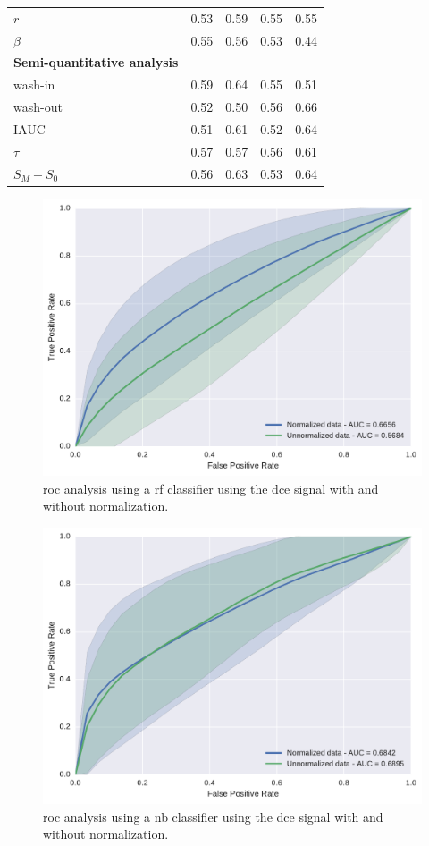 \begin{table}
\begin{tabular}{l c c c c}
    \quad $r$         & 0.53 & 0.59 & 0.55 & 0.55 \\
    \quad $\beta$     & 0.55 & 0.56 & 0.53 & 0.44 \\
    \textbf{Semi-quantitative analysis} & & & & \\
    \quad wash-in     & 0.59 & 0.64 & 0.55 & 0.51 \\
    \quad wash-out    & 0.52 & 0.50 & 0.56 & 0.66 \\
    \quad IAUC        & 0.51 & 0.61 & 0.52 & 0.64 \\
    \quad $\tau$      & 0.57 & 0.57 & 0.56 & 0.61 \\
    \quad $S_M - S_0$ & 0.56 & 0.63 & 0.53 & 0.64 \\
    \bottomrule
  \end{tabular}
  \label{tab:resfeats}
\end{table}

\begin{figure}
  \centering
  \includegraphics[width=0.7\linewidth]{03_experiments/figures/rf.pdf}
  \caption{\acs*{roc} analysis using a \acs*{rf} classifier using the \ac{dce} signal with and without normalization.}
  \label{fig:rfunorm}
\end{figure}

\begin{figure}
  \centering
  \includegraphics[width=0.7\linewidth]{03_experiments/figures/nb.pdf}
  \caption{\acs*{roc} analysis using a \acs*{nb} classifier using the \ac{dce} signal with and without normalization.}
  \label{fig:rfunorm}
\end{figure}

